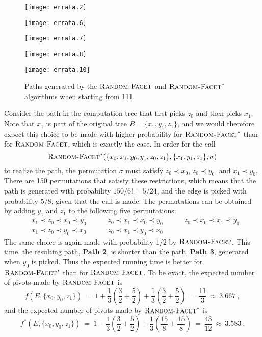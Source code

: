 \documentclass[twoside,11pt]{article}
\newcommand{\RandomFacet}{\mbox{\sc Random-}\allowbreak\mbox{\sc Facet}}
\begin{document}
\begin{figure}[t]
\begin{center}
\parbox{1.2in}{
\center
\texttt{[image: errata.2]}
}
\hspace*{5pt}
\parbox{1.5in}{
\center
\texttt{[image: errata.6]}
}
\hspace*{5pt}
\parbox{1.5in}{
\center
\texttt{[image: errata.7]}
}
\hspace*{5pt}
\parbox{1.5in}{
\center
\texttt{[image: errata.8]}
}

\vspace*{5pt}

\parbox{6in}{
\center
\texttt{[image: errata.10]}
\caption{Paths generated by the $\RandomFacet$ and $\RandomFacet^*$ algorithms when starting from 111.}\label{fig:faster}
}
\end{center}
\end{figure}

Consider the path in the computation tree that first picks $z_0$ and then picks $x_1$. Note that $x_1$ is part of the original tree $B= \{x_1,y_1,z_1\}$, and we would therefore expect this choice to be made with higher probability for $\RandomFacet^*$ than for $\RandomFacet$, which is exactly the case.
In order for the call
\[
\RandomFacet^*(\{x_0,x_1,y_0,y_1,z_0,z_1\},\{x_1,y_1,z_1\},\sigma)
\]
to realize the path, the permutation $\sigma$ must satisfy $z_0 \prec x_0$, $z_0 \prec y_0$, and $x_1 \prec y_0$. There are 150 permutations that satisfy these restrictions, which means that the path is generated with probability $150/6! = 5/24$, and the edge is picked with probability $5/8$, given that the call is made. The permutations can be obtained by adding $y_1$ and $z_1$ to the following five permutations:
\begin{align*}
&x_1 \prec z_0 \prec x_0 \prec y_0 \quad\quad\quad
z_0 \prec x_1 \prec x_0 \prec y_0 \quad\quad\quad
z_0 \prec x_0 \prec x_1 \prec y_0 \\
&x_1 \prec z_0 \prec y_0 \prec x_0 \quad\quad\quad
z_0 \prec x_1 \prec y_0 \prec x_0
\end{align*}
The same choice is again made with probability $1/2$ by $\RandomFacet$. This time, the resulting path, \textbf{Path 2}, is shorter than the path, \textbf{Path 3}, generated when $y_0$ is picked. Thus the expected running time is better for $\RandomFacet^*$ than for $\RandomFacet$. To be exact, the expected number of pivots made by $\RandomFacet$ is
\[
f(E,\{x_0,y_0,z_1\}) ~=~ 1 + \frac{1}{3}\left(\frac32 + \frac52\right) +
\frac{1}{3}\left(\frac32 + \frac52\right) ~=~ \frac{11}{3}~\approx~ 3.667~,
\]
and
the expected number of pivots made by $\RandomFacet^*$ is
\[
f^*(E,\{x_0,y_0,z_1\}) ~=~ 1 + \frac{1}{3}\left(\frac32 + \frac52\right) +
\frac{1}{3}\left(\frac{15}{8} + \frac{15}{8}\right) ~=~ \frac{43}{12}~\approx~ 3.583~.
\]
\end{document}
